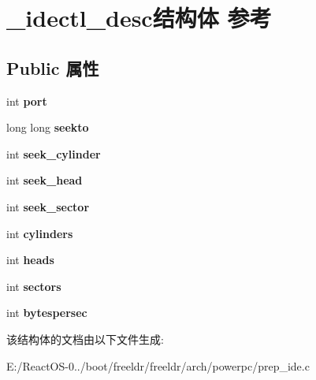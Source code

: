 \hypertarget{struct__idectl__desc}{}\section{\+\_\+idectl\+\_\+desc结构体 参考}
\label{struct__idectl__desc}
\subsection*{Public 属性}
\begin{DoxyCompactItemize}
\item 
\mbox{\label{struct__idectl__desc_a51a00dd399bfce8a80d6d7f0b0f8fb6b}} 
int {\bfseries port}
\item 
\mbox{\label{struct__idectl__desc_a558ff790652c2dad699308f4ae4ab363}} 
long long {\bfseries seekto}
\item 
\mbox{\label{struct__idectl__desc_aff2bf862a61ea74063b9213a92a2106f}} 
int {\bfseries seek\+\_\+cylinder}
\item 
\mbox{\label{struct__idectl__desc_a17d150ec2b7ba2df5e449d6918023749}} 
int {\bfseries seek\+\_\+head}
\item 
\mbox{\label{struct__idectl__desc_a954ceab047213fd061a264bf94563af2}} 
int {\bfseries seek\+\_\+sector}
\item 
\mbox{\label{struct__idectl__desc_a3b8cbaffa4d86560dbd61c3fe70d6656}} 
int {\bfseries cylinders}
\item 
\mbox{\label{struct__idectl__desc_ac7d9fee1949dc76385be2c4742d1f363}} 
int {\bfseries heads}
\item 
\mbox{\label{struct__idectl__desc_ae19c082c044e0c0a39c058e227bd78d6}} 
int {\bfseries sectors}
\item 
\mbox{\label{struct__idectl__desc_a838cb074f4be8b5252ebd6ab813caaeb}} 
int {\bfseries bytespersec}
\end{DoxyCompactItemize}


该结构体的文档由以下文件生成\+:\begin{DoxyCompactItemize}
\item 
E\+:/\+React\+O\+S-\/0../boot/freeldr/freeldr/arch/powerpc/prep\+\_\+ide.\+c\end{DoxyCompactItemize}
